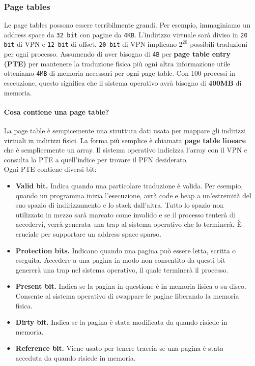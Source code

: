 \documentclass[12pt, letterpaper]{article}
\begin{document}
			\subsubsection{Page tables}
				Le page tables possono essere terribilmente grandi. Per esempio, immaginiamo un address space da \texttt{32 bit} con pagine da \texttt{4KB}. L'indirizzo virtuale sarà diviso in \texttt{20 bit} di VPN e \texttt{12 bit} di offset. \texttt{20 bit} di VPN implicano $2^{20}$ possibili traduzioni per ogni processo. Assumendo di aver bisogno di \texttt{4B} per \textbf{page table entry (PTE)} per mantenere la traduzione fisica più ogni altra informazione utile otteniamo \texttt{4MB} di memoria necessari per ogni page table. Con 100 processi in esecuzione, questo significa che il sistema operativo avrà bisogno di \textbf{400MB} di memoria. 
				\paragraph{Cosa contiene una page table?} La page table è sempicemente una struttura dati usata per mappare gli indirizzi virtuali in indirizzi fisici. La forma più semplice è chiamata \textbf{page table lineare} che è semplicemente un array. Il sistema operativo indicizza l'array con il VPN e consulta la PTE a quell'indice per trovare il PFN desiderato.\\ 
				Ogni PTE contiene diversi bit:
				\begin{itemize}
					\item \textbf{Valid bit.} Indica quando una particolare traduzione è valida. Per esempio, quando un programma inizia l'esecuzione, avrà code e heap a un'estremità del suo spazio di indirizzamento e lo stack dall'altra. Tutto lo spazio non utilizzato in mezzo sarà marcato come invalido e se il processo tenterà di accedervi, verrà generata una trap al sistema operativo che lo terminerà. È cruciale per supportare un address space sparso. 
					\item \textbf{Protection bits.} Indicano quando una pagina può essere letta, scritta o eseguita. Accedere a una pagina in modo non consentito da questi bit genererà una trap nel sistema operativo, il quale terminerà il processo.
					\item \textbf{Present bit.} Indica se la pagina in questione è in memoria fisica o su disco. Consente al sistema operativo di swappare le pagine liberando la memoria fisica.
					\item \textbf{Dirty bit.} Indica se la pagina è stata modificata da quando risiede in memoria.
					\item \textbf{Reference bit.} Viene usato per tenere traccia se una pagina è stata acceduta da quando risiede in memoria. 
				\end{itemize}
			
\end{document}
